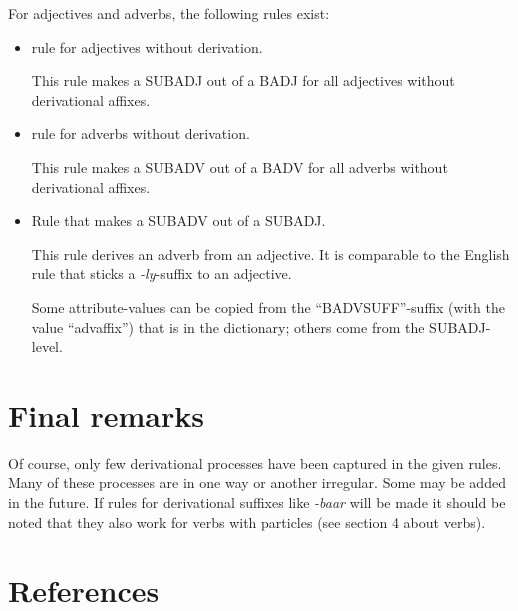 For adjectives and adverbs, the following rules exist:
\begin{itemize}
  \item rule for adjectives without derivation.

        This rule makes a SUBADJ out of a BADJ for all adjectives without 
        derivational affixes.

  \item rule for adverbs without derivation.

        This rule makes a SUBADV out of a BADV for all adverbs without 
        derivational affixes.

  \item Rule that makes a SUBADV out of a SUBADJ.

        This rule derives an adverb from an adjective. It is comparable to
        the English rule that sticks a {\em -ly}-suffix to an adjective.

        Some attribute-values can be copied from the ``BADVSUFF''-suffix 
        (with the value ``advaffix'') that
        is in the dictionary; others come from the SUBADJ-level.

\end{itemize}

\newpage

\section{Final remarks}

Of course, only few derivational processes have been captured in the given 
rules.  Many of these processes are in one way or another irregular. Some may
be added in the future.
If rules for derivational suffixes like {\em -baar} will be made it should be
noted that they also work for verbs with particles (see section 4 about verbs).


\newpage


\section{References}

